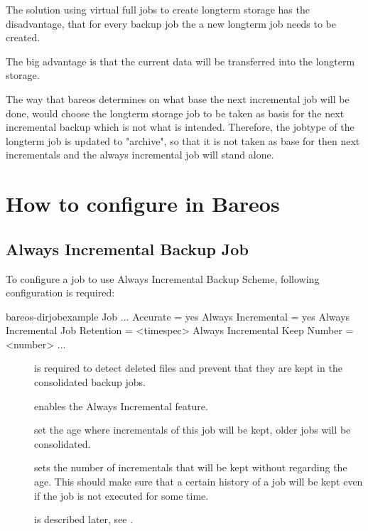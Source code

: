 The solution using virtual full jobs to create longterm storage has the disadvantage, that for every backup job the a new longterm job needs to be created.

The big advantage is that the current data will be transferred into the longterm storage.

The way that bareos determines on what base the next incremental job will be done, would choose the longterm storage job to be taken as basis for the next incremental backup which is not what is intended. Therefore, the jobtype of the 
longterm job is updated to "archive", so that it is not taken as base for then next incrementals and the always incremental job will stand alone.

\section{How to configure in Bareos}

\subsection{Always Incremental Backup Job}

To configure a job to use Always Incremental Backup Scheme, following configuration is required:

\begin{bareosConfigResource}{bareos-dir}{job}{example}
Job {
    ...
    Accurate = yes
    Always Incremental = yes
    Always Incremental Job Retention = <timespec>
    Always Incremental Keep Number = <number>
    ...
}
\end{bareosConfigResource}

\begin{description}
    \item[] is required to detect deleted files and prevent that they are kept in the consolidated backup jobs.
    \item[] enables the Always Incremental feature.
    \item[] set the age where incrementals of this job will be kept, older jobs will be consolidated.
    \item[] sets the number of incrementals that will be kept without regarding the age. This should make sure that a certain history of a  job will be kept even if the job is not executed for some time.
    \item[] is described later, see .
\end{description}


